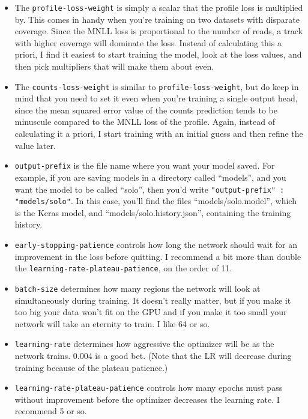 \documentclass{article}
\begin{document}
\begin{itemize}
    \item The \texttt{profile-loss-weight} is simply a scalar that the profile loss is multiplied by. This comes in handy when you're training on two datasets with disparate coverage. Since the MNLL loss is proportional to the number of reads, a track with higher coverage will dominate the loss. Instead of calculating this a priori, I find it easiest to start training the model, look at the loss values, and then pick multipliers that will make them about even.
    \item The \texttt{counts-loss-weight} is similar to \texttt{profile-loss-weight}, but do keep in mind that you need to set it even when you're training a single output head, since the mean squared error value of the counts prediction tends to be minuscule compared to the MNLL loss of the profile. Again, instead of calculating it a priori, I start training with an initial guess and then refine the value later.
    \item \texttt{output-prefix} is the file name where you want your model saved. For example, if you are saving models in a directory called ``models'', and you want the model to be called ``solo'', then you'd write \texttt{"output-prefix" : "models/solo"}. In this case, you'll find the files ``models/solo.model'', which is the Keras model, and ``models/solo.history.json'', containing the training history.
    \item \texttt{early-stopping-patience} controls how long the network should wait for an improvement in the loss before quitting. I recommend a bit more than double the \texttt{learning-rate-plateau-patience}, on the order of 11.
    \item \texttt{batch-size} determines how many regions the network will look at simultaneously during training. It doesn't really matter, but if you make it too big your data won't fit on the GPU and if you make it too small your network will take an eternity to train. I like 64 or so.
    \item \texttt{learning-rate} determines how aggressive the optimizer will be as the network trains. 0.004 is a good bet. (Note that the LR will decrease during training because of the plateau patience.)
    \item \texttt{learning-rate-plateau-patience} controls how many epochs must pass without improvement before the optimizer decreases the learning rate. I recommend 5 or so.


\end{itemize}
\end{document}
